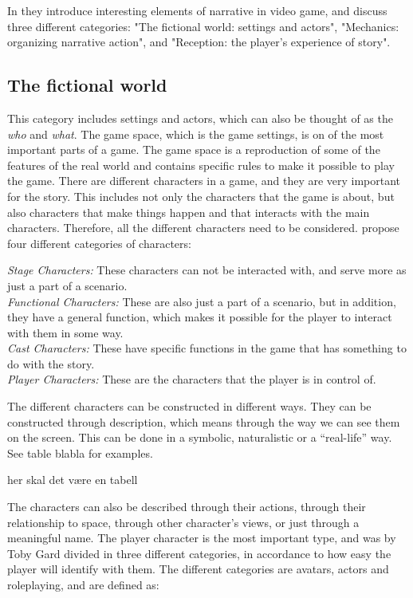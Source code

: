 In \cite{understandingvg} they introduce interesting elements of narrative in video game, and discuss three different categories: "The fictional world: settings and actors", "Mechanics: organizing narrative action", and "Reception: the player’s experience of story".

\subsection{The fictional world}
This category includes settings and actors, which can also be thought of as the \emph{who} and \emph{what}. The game space, which is the game settings, is on of the most important parts of a game. The game space is a reproduction of some of the features of the real world and contains specific rules to make it possible to play the game. There are different characters in a game, and they are very important for the story. This includes not only the characters that the game is about, but also characters that make things happen and that interacts with the main characters. Therefore, all the different characters need to be considered. \cite{understandingvg} propose four different categories of characters: 

\emph{Stage Characters:} These characters can not be interacted with, and serve more as just a part of a scenario. \\
\emph{Functional Characters:} These are also just a part of a scenario, but in addition, they have a general function, which makes it possible for the player to interact with them in some way. \\
\emph{Cast Characters:} These have specific functions in the game that has something to do with the story. \\
\emph{Player Characters:} These are the characters that the player is in control of. 

The different characters can be constructed in different ways. They can be constructed through description, which means through the way we can see them on the screen. This can be done in a symbolic, naturalistic or a “real-life” way. See table blabla for examples.

her skal det være en tabell

The characters can also be described through their actions, through their relationship to space, through other character’s views, or just through a meaningful name. The player character is the most important type, and was by Toby Gard divided in three different categories, in accordance to how easy the player will identify with them. The different categories are avatars, actors and roleplaying, and are defined as:

